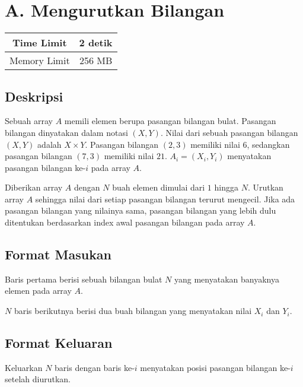 \documentclass{article}
\begin{document}
\section*{\hfil A. Mengurutkan Bilangan\hfil}

\begin{center}
\begin{tabular}{ |cc| } 
 \hline
 Time Limit & 2 detik \\
 \hline 
 Memory Limit & 256 MB \\
 \hline
\end{tabular}
\end{center}

\subsection*{Deskripsi}

\par\noindent Sebuah array $A$ memili elemen berupa pasangan bilangan bulat. Pasangan bilangan dinyatakan dalam notasi $(X,Y)$. Nilai dari sebuah pasangan bilangan $(X,Y)$ adalah $X \times Y$. Pasangan bilangan $(2,3)$ memiliki nilai $6$, sedangkan pasangan bilangan $(7,3)$ memiliki nilai $21$. $A_i = (X_i, Y_i)$ menyatakan pasangan bilangan ke-$i$ pada array $A$.

\par\noindent Diberikan array $A$ dengan $N$ buah elemen dimulai dari $1$ hingga $N$. Urutkan array $A$ sehingga nilai dari setiap pasangan bilangan terurut mengecil. Jika ada pasangan bilangan yang nilainya sama, pasangan bilangan yang lebih dulu ditentukan berdasarkan index awal pasangan bilangan pada array $A$.

\subsection*{Format Masukan}

\par\noindent Baris pertama berisi sebuah bilangan bulat $N$ yang menyatakan banyaknya elemen pada array $A$.
\par\noindent $N$ baris berikutnya berisi dua buah bilangan yang menyatakan nilai $X_i$ dan $Y_i$.

\subsection*{Format Keluaran}

\par\noindent Keluarkan $N$ baris dengan baris ke-$i$ menyatakan posisi pasangan bilangan ke-$i$ setelah diurutkan.
\end{document}
